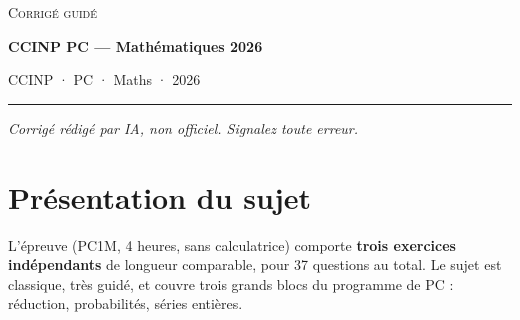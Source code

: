 \documentclass[11pt,a4paper]{article}
\begin{document}
\thispagestyle{plain}
\begin{center}
  {\small\scshape Corrigé guidé}\par\smallskip
  {\LARGE\bfseries CCINP PC — Mathématiques 2026\par}\medskip
  {\large CCINP · PC · Maths · 2026\par}
\end{center}
\vspace{2pt}\hrule\vspace{8pt}

\emph{Corrigé rédigé par IA, non officiel. Signalez toute erreur.}

\hypertarget{pruxe9sentation-du-sujet}{%
\section{Présentation du sujet}\label{pruxe9sentation-du-sujet}}

L'épreuve (PC1M, 4 heures, sans calculatrice) comporte \textbf{trois exercices indépendants} de longueur comparable, pour 37 questions au total. Le sujet est classique, très guidé, et couvre trois grands blocs du programme de PC : réduction, probabilités, séries entières.
\end{document}
